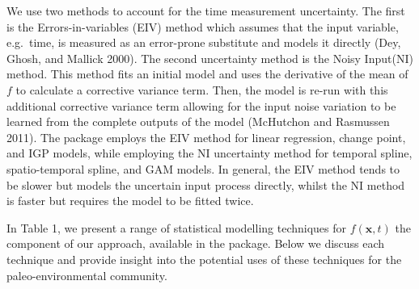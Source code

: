 We use two methods to account for the time measurement uncertainty. The first is the Errors-in-variables (EIV) method which assumes that the input variable, e.g.~time, is measured as an error-prone substitute and models it directly (Dey, Ghosh, and Mallick 2000). The second uncertainty method is the Noisy Input(NI) method. This method fits an initial model and uses the derivative of the mean of \(f\) to calculate a corrective variance term. Then, the model is re-run with this additional corrective variance term allowing for the input noise variation to be learned from the complete outputs of the model (McHutchon and Rasmussen 2011). The  package employs the EIV method for linear regression, change point, and IGP models, while employing the NI uncertainty method for temporal spline, spatio-temporal spline, and GAM models. In general, the EIV method tends to be slower but models the uncertain input process directly, whilst the NI method is faster but requires the model to be fitted twice.

In Table 1, we present a range of statistical modelling techniques for \(f(\mathbf{x},t)\) the component of our approach, available in the  package. Below we discuss each technique and provide insight into the potential uses of these techniques for the paleo-environmental community.

